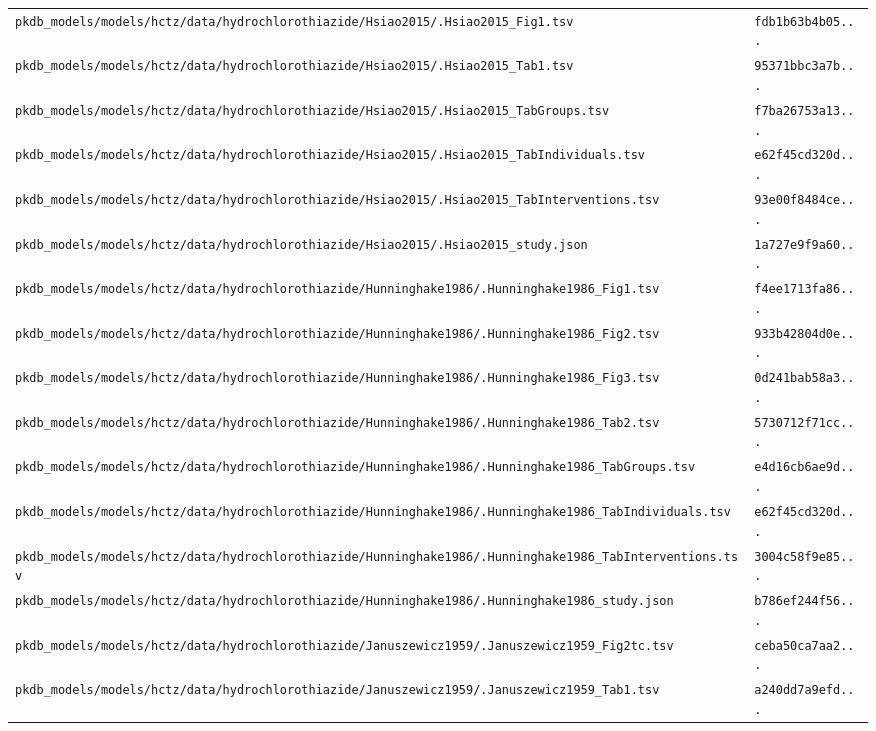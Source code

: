 \begin{longtable}{ll}
\texttt{pkdb\_models/models/hctz/data/hydrochlorothiazide/Hsiao2015/.Hsiao2015\_Fig1.tsv} & \texttt{fdb1b63b4b05...} \\
\texttt{pkdb\_models/models/hctz/data/hydrochlorothiazide/Hsiao2015/.Hsiao2015\_Tab1.tsv} & \texttt{95371bbc3a7b...} \\
\texttt{pkdb\_models/models/hctz/data/hydrochlorothiazide/Hsiao2015/.Hsiao2015\_TabGroups.tsv} & \texttt{f7ba26753a13...} \\
\texttt{pkdb\_models/models/hctz/data/hydrochlorothiazide/Hsiao2015/.Hsiao2015\_TabIndividuals.tsv} & \texttt{e62f45cd320d...} \\
\texttt{pkdb\_models/models/hctz/data/hydrochlorothiazide/Hsiao2015/.Hsiao2015\_TabInterventions.tsv} & \texttt{93e00f8484ce...} \\
\texttt{pkdb\_models/models/hctz/data/hydrochlorothiazide/Hsiao2015/.Hsiao2015\_study.json} & \texttt{1a727e9f9a60...} \\
\texttt{pkdb\_models/models/hctz/data/hydrochlorothiazide/Hunninghake1986/.Hunninghake1986\_Fig1.tsv} & \texttt{f4ee1713fa86...} \\
\texttt{pkdb\_models/models/hctz/data/hydrochlorothiazide/Hunninghake1986/.Hunninghake1986\_Fig2.tsv} & \texttt{933b42804d0e...} \\
\texttt{pkdb\_models/models/hctz/data/hydrochlorothiazide/Hunninghake1986/.Hunninghake1986\_Fig3.tsv} & \texttt{0d241bab58a3...} \\
\texttt{pkdb\_models/models/hctz/data/hydrochlorothiazide/Hunninghake1986/.Hunninghake1986\_Tab2.tsv} & \texttt{5730712f71cc...} \\
\texttt{pkdb\_models/models/hctz/data/hydrochlorothiazide/Hunninghake1986/.Hunninghake1986\_TabGroups.tsv} & \texttt{e4d16cb6ae9d...} \\
\texttt{pkdb\_models/models/hctz/data/hydrochlorothiazide/Hunninghake1986/.Hunninghake1986\_TabIndividuals.tsv} & \texttt{e62f45cd320d...} \\
\texttt{pkdb\_models/models/hctz/data/hydrochlorothiazide/Hunninghake1986/.Hunninghake1986\_TabInterventions.tsv} & \texttt{3004c58f9e85...} \\
\texttt{pkdb\_models/models/hctz/data/hydrochlorothiazide/Hunninghake1986/.Hunninghake1986\_study.json} & \texttt{b786ef244f56...} \\
\texttt{pkdb\_models/models/hctz/data/hydrochlorothiazide/Januszewicz1959/.Januszewicz1959\_Fig2tc.tsv} & \texttt{ceba50ca7aa2...} \\
\texttt{pkdb\_models/models/hctz/data/hydrochlorothiazide/Januszewicz1959/.Januszewicz1959\_Tab1.tsv} & \texttt{a240dd7a9efd...} \\

\end{longtable}
